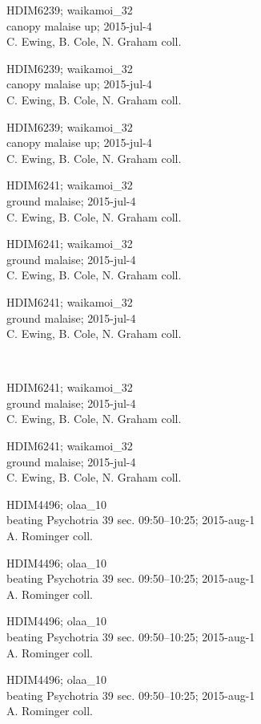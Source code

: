 \documentclass[2pt]{extarticle}
\begin{document}
\noindent
\parbox{0.16\textwidth}{\tiny \raggedright \rule[-0.3\baselineskip]{0pt}{10pt}HDIM6239; waikamoi\_32\\ canopy malaise up; 2015-jul-4\\ C. Ewing, B. Cole, N. Graham coll.}
\parbox{0.16\textwidth}{\tiny \raggedright \rule[-0.3\baselineskip]{0pt}{10pt}HDIM6239; waikamoi\_32\\ canopy malaise up; 2015-jul-4\\ C. Ewing, B. Cole, N. Graham coll.}
\parbox{0.16\textwidth}{\tiny \raggedright \rule[-0.3\baselineskip]{0pt}{10pt}HDIM6239; waikamoi\_32\\ canopy malaise up; 2015-jul-4\\ C. Ewing, B. Cole, N. Graham coll.}
\parbox{0.16\textwidth}{\tiny \raggedright \rule[-0.3\baselineskip]{0pt}{10pt}HDIM6241; waikamoi\_32\\ ground malaise; 2015-jul-4\\ C. Ewing, B. Cole, N. Graham coll.}
\parbox{0.16\textwidth}{\tiny \raggedright \rule[-0.3\baselineskip]{0pt}{10pt}HDIM6241; waikamoi\_32\\ ground malaise; 2015-jul-4\\ C. Ewing, B. Cole, N. Graham coll.}
\parbox{0.16\textwidth}{\tiny \raggedright \rule[-0.3\baselineskip]{0pt}{10pt}HDIM6241; waikamoi\_32\\ ground malaise; 2015-jul-4\\ C. Ewing, B. Cole, N. Graham coll.} \\ 
\vspace{0.001in} 

\noindent
\parbox{0.16\textwidth}{\tiny \raggedright \rule[-0.3\baselineskip]{0pt}{10pt}HDIM6241; waikamoi\_32\\ ground malaise; 2015-jul-4\\ C. Ewing, B. Cole, N. Graham coll.}
\parbox{0.16\textwidth}{\tiny \raggedright \rule[-0.3\baselineskip]{0pt}{10pt}HDIM6241; waikamoi\_32\\ ground malaise; 2015-jul-4\\ C. Ewing, B. Cole, N. Graham coll.}
\parbox{0.16\textwidth}{\tiny \raggedright \rule[-0.3\baselineskip]{0pt}{10pt}HDIM4496; olaa\_10\\ beating Psychotria 39 sec. 09:50--10:25; 2015-aug-1\\ A. Rominger coll.}
\parbox{0.16\textwidth}{\tiny \raggedright \rule[-0.3\baselineskip]{0pt}{10pt}HDIM4496; olaa\_10\\ beating Psychotria 39 sec. 09:50--10:25; 2015-aug-1\\ A. Rominger coll.}
\parbox{0.16\textwidth}{\tiny \raggedright \rule[-0.3\baselineskip]{0pt}{10pt}HDIM4496; olaa\_10\\ beating Psychotria 39 sec. 09:50--10:25; 2015-aug-1\\ A. Rominger coll.}
\parbox{0.16\textwidth}{\tiny \raggedright \rule[-0.3\baselineskip]{0pt}{10pt}HDIM4496; olaa\_10\\ beating Psychotria 39 sec. 09:50--10:25; 2015-aug-1\\ A. Rominger coll.} \\ 
\vspace{0.001in} 
\end{document}
